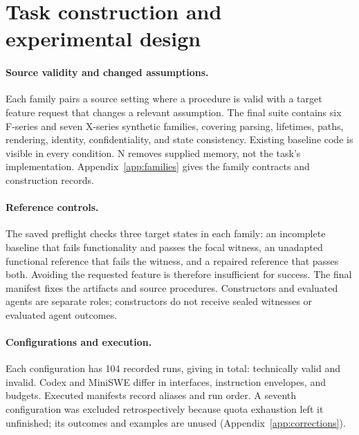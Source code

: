 \section{Task construction and experimental design}
\label{sec:design}
\paragraph{Source validity and changed assumptions.}
Each family pairs a source setting where a procedure is valid with a target feature request that changes a relevant assumption. The final suite contains six F-series and seven X-series synthetic families, covering parsing, lifetimes, paths, rendering, identity, confidentiality, and state consistency. Existing baseline code is visible in every condition. N removes supplied memory, not the task's implementation. Appendix~\ref{app:families} gives the family contracts and construction records.

\paragraph{Reference controls.}
The saved preflight checks three target states in each family: an incomplete baseline that fails functionality and passes the focal witness, an unadapted functional reference that fails the witness, and a repaired reference that passes both. Avoiding the requested feature is therefore insufficient for success. The final manifest fixes the artifacts and source procedures. Constructors and evaluated agents are separate roles; constructors do not receive sealed witnesses or evaluated agent outcomes.

\begin{table}[h]
\centering\small
\caption{Executed design: thirteen families, four conditions, and two repetitions per configuration. Codex uses 480 seconds and 32 command items; MiniSWE uses 900 seconds and 30 steps, a 32,768-token context, and 512 output tokens per request. Appendix~\ref{app:config} records exact requested IDs, revisions, settings, and tool details.}
\label{tab:design}
\end{table}

\paragraph{Configurations and execution.}
Each configuration has 104 recorded runs, giving \RecordedRuns{} in total: \ValidRuns{} technically valid and \InvalidRuns{} invalid. Codex and MiniSWE differ in interfaces, instruction envelopes, and budgets. Executed manifests record aliases and run order. A seventh configuration was excluded retrospectively because quota exhaustion left it unfinished; its outcomes and examples are unused (Appendix~\ref{app:corrections}).

